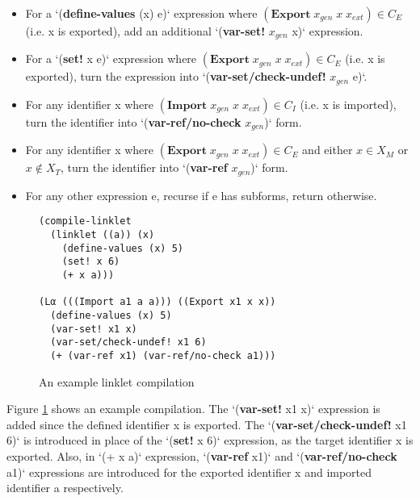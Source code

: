 \begin{itemize}
 \item For a `(\textbf{define-values} (x) e)` expression where \newline
   $(\textbf{Export}\; x_{gen}\; x\; x_{ext}) \in \mathit{C_E}$ (i.e. x
   is exported), add an additional `(\textbf{var-set!} $x_{gen}$ x)`
   expression.
 \item For a `(\textbf{set!} x e)` expression where \newline
   $(\textbf{Export}\; x_{gen}\; x\; x_{ext}) \in \mathit{C_E}$ (i.e. x
   is exported), turn the expression into
   `(\textbf{var-set/check-undef!} $x_{gen}$ e)`.
 \item For any identifier x where $(\textbf{Import}\; x_{gen}\; x\;
   x_{ext}) \in \mathit{C_I}$ (i.e. x is imported), turn the identifier
   into \newline `(\textbf{var-ref/no-check} $x_{gen}$)` form.
  \item For any identifier x where $(\textbf{Export}\; x_{gen}\; x\; x_{ext}) \in
    \mathit{C_E}$ and either $x \in \mathit{X_M}$ or $x \notin \mathit{X_T}$,
    turn the identifier into `(\textbf{var-ref} $x_{gen}$)` form.
  \item For any other expression e, recurse if e has subforms, return
    otherwise.
\end{itemize}

\begin{figure}[h]
  \begin{mdframed}
\begin{verbatim}
(compile-linklet
  (linklet ((a)) (x)
    (define-values (x) 5)
    (set! x 6)
    (+ x a)))

(Lα (((Import a1 a a))) ((Export x1 x x))
  (define-values (x) 5)
  (var-set! x1 x)
  (var-set/check-undef! x1 6)
  (+ (var-ref x1) (var-ref/no-check a1)))
\end{verbatim}
\caption{An example linklet compilation}
\label{fig:compile-example}
\end{mdframed}
\end{figure}

Figure \ref{fig:compile-example} shows an example compilation. The
`(\textbf{var-set!} x1 x)` expression is added since the defined
identifier x is exported. The `(\textbf{var-set/check-undef!} x1 6)`
is introduced in place of the `(\textbf{set!} x 6)` expression, as the
target identifier x is exported. Also, in `(+ x a)` expression,
`(\textbf{var-ref} x1)` and `(\textbf{var-ref/no-check} a1)`
expressions are introduced for the exported identifier x and imported
identifier a respectively.

